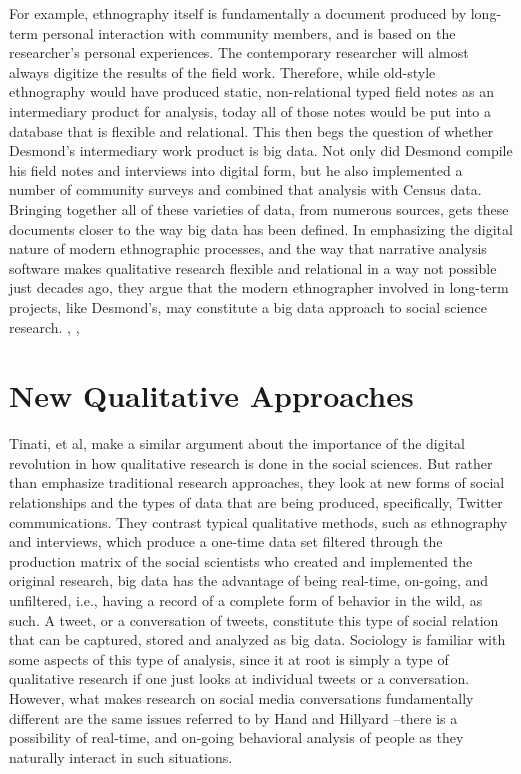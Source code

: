 \documentclass[sigconf]{acmart}
\begin{document}
For example, ethnography itself is fundamentally a document produced by long-term personal interaction with community members, and is based on the researcher's personal experiences.  The contemporary researcher will almost always digitize the results of the field work.  Therefore, while old-style ethnography would have produced static, non-relational typed field notes as an intermediary product for analysis, today all of those notes would be put into a database that is flexible and relational.  This then begs the question of whether Desmond's intermediary work product is big data.  Not only did Desmond compile his field notes and interviews into digital form, but he also implemented a number of community surveys and combined that analysis with Census data. \cite{desmond16} Bringing together all of these varieties of data, from numerous sources, gets these documents closer to the way big data has been defined.  In emphasizing the digital nature of modern ethnographic processes, and the way that narrative analysis software makes qualitative research flexible and relational in a way not possible just decades ago, they argue that the modern ethnographer involved in long-term projects, like Desmond's, may constitute a big data approach to social science research. \cite{hand14}, \cite{japec15}, \cite{lazer17}

\section{New Qualitative Approaches}
Tinati, et al, make a similar argument about the importance of the digital revolution in how qualitative research is done in the social sciences. \cite{tinati14}  But rather than emphasize traditional research approaches, they look at new forms of social relationships and the types of data that are being produced, specifically, Twitter communications.  They contrast typical qualitative methods, such as ethnography and interviews, which produce a one-time data set filtered through the production matrix of the social scientists who created and implemented the original research, big data has the advantage of being real-time, on-going, and unfiltered, i.e., having a record of a complete form of behavior in the wild, as such.  A tweet, or a conversation of tweets, constitute this type of social relation that can be captured, stored and analyzed as big data. \cite{felt16}  Sociology is familiar with some aspects of this type of analysis, since it at root is simply a type of qualitative research if one just looks at individual tweets or a conversation.  However, what makes research on social media conversations fundamentally different are the same issues referred to by Hand and Hillyard \cite{hand14}--there is a possibility of real-time, and on-going behavioral analysis of people as they naturally interact in such situations. 
\end{document}
